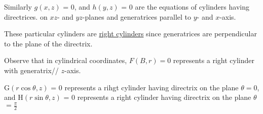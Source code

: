 \documentclass[11pt]{amsbook}
\begin{document}
\par
Similarly $g(x, z)$ = 0, and $h(y, z)$ = 0 are the equations of cylinders having directrices. on $xz$- and $yz$-planes and generatrices parallel to $y$- and $x$-axis. 


\par
These particular cylinders are \underline{right cylinders} since 
generatrices are perpendicular to the plane of the directrix.

\par
Observe that in cylindrical coordinates, $F(B, r) = 0$ represents a right cylinder with generatrix\hspace{4pt}//  $z$-axis. 

\par
G$(r \cos\theta, z)$ = $0$ represents a rihgt cylinder having directrix on the plane $\theta = 0$, and H$(r \sin\theta, z)$ = $0$ represents a right cylinder having directrix on the plane $\theta$$=$$\frac{\pi}{2}$

\par
 
 
\end{document}
